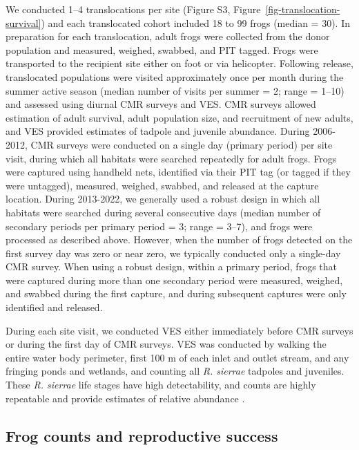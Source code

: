 \documentclass[9pt,twocolumn,twoside,lineno]{pnas-new}
\begin{document}
{We conducted 1--4 translocations per site (Figure S3,
Figure~\ref{fig-translocation-survival}) and each translocated cohort
included 18 to 99 frogs (median = 30). In preparation for each
translocation, adult frogs were collected from the donor population and
measured, weighed, swabbed, and PIT tagged. Frogs were transported to
the recipient site either on foot or via helicopter. Following release,
translocated populations were visited approximately once per month
during the summer active season (median number of visits per summer = 2;
range = 1--10) and assessed using diurnal CMR surveys and VES. CMR
surveys allowed estimation of adult survival, adult population size, and
recruitment of new adults, and VES provided estimates of tadpole and
juvenile abundance. During 2006-2012, CMR surveys were conducted on a
single day (primary period) per site visit, during which all habitats
were searched repeatedly for adult frogs. Frogs were captured using
handheld nets, identified via their PIT tag (or tagged if they were
untagged), measured, weighed, swabbed, and released at the capture
location. During 2013-2022, we generally used a robust design in which
all habitats were searched during several consecutive days (median
number of secondary periods per primary period = 3; range = 3--7), and
frogs were processed as described above. However, when the number of
frogs detected on the first survey day was zero or near zero, we
typically conducted only a single-day CMR survey. When using a robust
design, within a primary period, frogs that were captured during more
than one secondary period were measured, weighed, and swabbed during the
first capture, and during subsequent captures were only identified and
released.

During each site visit, we conducted VES either immediately before CMR
surveys or during the first day of CMR surveys. VES was conducted by
walking the entire water body perimeter, first 100 m of each inlet and
outlet stream, and any fringing ponds and wetlands, and counting all
\emph{R. sierrae} tadpoles and juveniles. These \emph{R. sierrae} life
stages have high detectability, and counts are highly repeatable and
provide estimates of relative abundance \citep{knapp2000}.

\hypertarget{frog-counts-and-reproductive-success}{%
\subsection*{Frog counts and reproductive
success}\label{frog-counts-and-reproductive-success}}

}
\end{document}

